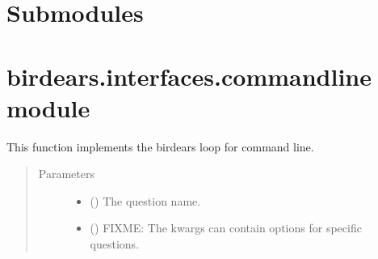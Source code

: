 \documentclass[letterpaper,10pt,english]{sphinxmanual}
\begin{document}
\section{Submodules}
\label{\detokenize{index:id13}}

\section{birdears.interfaces.commandline module}
\label{\detokenize{index:birdears-interfaces-commandline-module}}\label{\detokenize{index:module-birdears.interfaces.commandline}}

\begin{fulllineitems}
\label{\detokenize{index:birdears.interfaces.commandline.CommandLine}}
This function implements the birdears loop for command line.
\begin{quote}\begin{description}
\item[{Parameters}] \leavevmode\begin{itemize}
\item {} 
 () \textendash{} The question name.

\item {} 
 () \textendash{} FIXME: The kwargs can contain options for specific
questions.

\end{itemize}

\end{description}\end{quote}

\end{fulllineitems}

\end{document}
